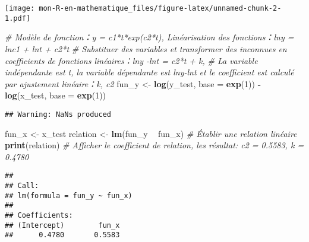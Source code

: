 \documentclass[
]{article}
\newenvironment{Shaded}{\begin{snugshade}}{\end{snugshade}}
\newcommand{\CommentTok}[1]{\textcolor[rgb]{0.56,0.35,0.01}{\textit{#1}}}
\newcommand{\DataTypeTok}[1]{\textcolor[rgb]{0.13,0.29,0.53}{#1}}
\newcommand{\DecValTok}[1]{\textcolor[rgb]{0.00,0.00,0.81}{#1}}
\newcommand{\KeywordTok}[1]{\textcolor[rgb]{0.13,0.29,0.53}{\textbf{#1}}}
\newcommand{\NormalTok}[1]{#1}
\newcommand{\OperatorTok}[1]{\textcolor[rgb]{0.81,0.36,0.00}{\textbf{#1}}}
\newcommand{\StringTok}[1]{\textcolor[rgb]{0.31,0.60,0.02}{#1}}
\begin{document}
\texttt{[image: mon-R-en-mathematique\_files/figure-latex/unnamed-chunk-2-1.pdf]}

\begin{Shaded}
\begin{Highlighting}[]
\CommentTok{# Modèle de fonction：y = c1*t*exp(c2*t), Linéarisation des fonctions：lny = lnc1 + lnt + c2*t}
\CommentTok{# Substituer des variables et transformer des inconnues en coefficients de fonctions linéaires：lny -lnt = c2*t + k,}
\CommentTok{# La variable indépendante est t, la variable dépendante est lny-lnt et le coefficient est calculé par ajustement linéaire：k, c2}
\NormalTok{fun_y <-}\StringTok{ }\KeywordTok{log}\NormalTok{(y_test, }\DataTypeTok{base =} \KeywordTok{exp}\NormalTok{(}\DecValTok{1}\NormalTok{)) }\OperatorTok{-}\StringTok{ }\KeywordTok{log}\NormalTok{(x_test, }\DataTypeTok{base =} \KeywordTok{exp}\NormalTok{(}\DecValTok{1}\NormalTok{))}
\end{Highlighting}
\end{Shaded}

\begin{verbatim}
## Warning: NaNs produced
\end{verbatim}

\begin{Shaded}
\begin{Highlighting}[]
\NormalTok{fun_x <-}\StringTok{ }\NormalTok{x_test}
\NormalTok{relation <-}\StringTok{ }\KeywordTok{lm}\NormalTok{(fun_y }\OperatorTok{~}\StringTok{ }\NormalTok{fun_x)  }\CommentTok{# Établir une relation linéaire}
\KeywordTok{print}\NormalTok{(relation)  }\CommentTok{# Afficher le coefficient de relation, les résultat: c2 = 0.5583, k = 0.4780}
\end{Highlighting}
\end{Shaded}

\begin{verbatim}
## 
## Call:
## lm(formula = fun_y ~ fun_x)
## 
## Coefficients:
## (Intercept)        fun_x  
##      0.4780       0.5583
\end{verbatim}
\end{document}
